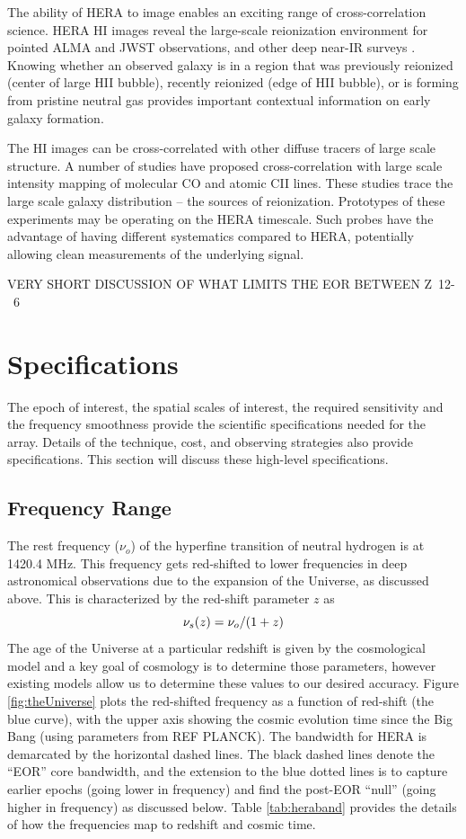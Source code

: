 \documentclass[ars]{/Users/daviddeboer1/Documents/Papers/Copernicus_LaTeX_Package_v_2_7/copernicus}
\begin{document}
The ability of HERA to image enables an exciting range of cross-correlation science.
HERA HI images reveal the large-scale reionization environment for pointed ALMA and
JWST observations, and other deep near-IR surveys \citep{lidz_et_al2009}. Knowing
whether an observed galaxy is in a region that was previously reionized (center of
large HII bubble), recently reionized (edge of HII bubble), or is forming from
pristine neutral gas provides important contextual information on early galaxy
formation.

The HI images can be cross-correlated with other diffuse tracers of large scale
structure. A number of studies have proposed cross-correlation with large scale
intensity mapping of molecular CO \cite{lidz_et_al2011} and atomic CII
\citep{gong_et_al2011} lines. These studies trace the large scale galaxy distribution
-- the sources of reionization. Prototypes of these experiments may be operating on
the HERA timescale. Such probes have the advantage of having different systematics
compared to HERA, potentially allowing clean measurements of the underlying signal.


VERY SHORT DISCUSSION OF WHAT LIMITS THE EOR BETWEEN Z~12-~6


\section{Specifications}
\label{sec:spec}
The epoch of interest, the spatial scales of interest, the required sensitivity and
the frequency smoothness provide the scientific specifications needed for the array.
Details of the technique, cost, and observing strategies also provide specifications.
This section will discuss these high-level specifications.

\subsection{Frequency Range}
The rest frequency ($\nu_o$) of the hyperfine transition of neutral hydrogen is at
1420.4 MHz. This frequency gets red-shifted to lower frequencies in deep astronomical
observations due to the expansion of the Universe, as discussed above. This is
characterized by the red-shift parameter $z$ as
\begin{equation}
\centering
\label{eq:redshift}
\nu_s(z) = \nu_o/(1+z)
\end{equation}
The age of the Universe at a particular redshift is given by the cosmological model
and a key goal of cosmology is to determine those parameters, however existing models
allow us to determine these values to our desired accuracy. Figure
\ref{fig:theUniverse} plots the red-shifted frequency as a function of red-shift (the
blue curve), with the upper axis showing the cosmic evolution time since the Big Bang
(using parameters from REF PLANCK). The bandwidth for HERA is demarcated by the
horizontal dashed lines. The black dashed lines denote the ``EOR'' core bandwidth,
and the extension to the blue dotted lines is to capture earlier epochs (going lower
in frequency) and find the post-EOR ``null'' (going higher in frequency) as discussed
below. Table \ref{tab:heraband} provides the details of how the frequencies map to
redshift and cosmic time.
\end{document}

